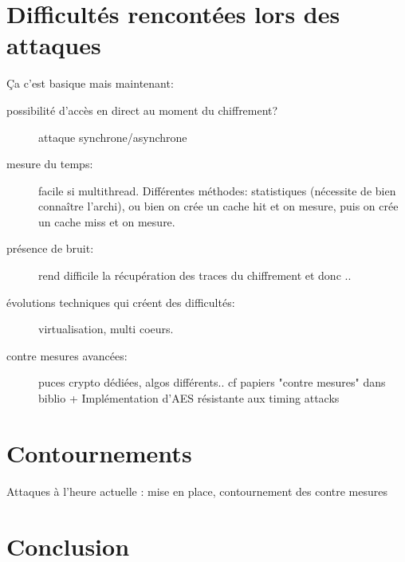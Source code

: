 \documentclass[a4paper,11pt]{article}
\begin{document}
\section{Difficultés rencontées lors des attaques} %
Ça c'est basique mais maintenant:
\begin{description}
\item[possibilité d'accès en direct au moment du chiffrement?] attaque synchrone/asynchrone~\cite{osvik2006cache}
\item[mesure du temps:] facile si multithread. Différentes méthodes: statistiques (nécessite de bien connaître l'archi), ou bien on crée un cache hit et on mesure, puis on crée un cache miss et on mesure.
\item[présence de bruit:] rend difficile la récupération des traces du chiffrement et donc ..
\item[évolutions techniques qui créent des difficultés:] virtualisation, multi coeurs. 
\item[contre mesures avancées:]  puces crypto dédiées, algos différents.. cf papiers "contre mesures" dans biblio + Implémentation d'AES résistante aux timing attacks~\cite{kasper2009faster}
\end{description}

\section{Contournements}
Attaques à l'heure actuelle : mise en place, contournement des contre mesures

\section*{Conclusion}

\newpage
\nocite{*}


\end{document}
